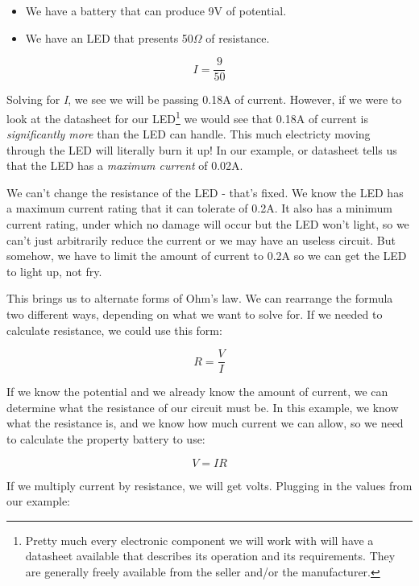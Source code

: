 \documentclass[10pt]{report}
\begin{document}
\begin{itemize}
\item We have a battery that can produce 9V of potential.
\item We have an LED that presents 50$\Omega$ of resistance.
\end{itemize}

\begin{equation}
I = \frac{9}{50}
\end{equation}

Solving for \textit{I}, we see we will be passing 0.18A of current. However, if we were to look at the datasheet for our LED\footnote{Pretty much every electronic component we will work with will have a datasheet available that describes its operation and its requirements. They are generally freely available from the seller and/or the manufacturer.} we would see that 0.18A of current is \textit{significantly more} than the LED can handle. This much electricty moving through the LED will literally burn it up! In our example, or datasheet tells us that the LED has a \textit{maximum current} of 0.02A. 

We can't change the resistance of the LED - that's fixed. We know the LED has a maximum current rating that it can tolerate of 0.2A. It also has a minimum current rating, under which no damage will occur but the LED won't light, so we can't just arbitrarily reduce the current or we may have an useless circuit. But somehow, we have to limit the amount of current to 0.2A so we can get the LED to light up, not fry.

This brings us to alternate forms of Ohm's law. We can rearrange the formula two different ways, depending on what we want to solve for. If we needed to calculate resistance, we could use this form:

\begin{equation}
R = \frac{V}{I}
\end{equation}

If we know the potential and we already know the amount of current, we can determine what the resistance of our circuit must be. In this example, we know what the resistance is, and we know how much current we can allow, so we need to calculate the property battery to use:

\begin{equation}
V = IR
\end{equation}

If we multiply current by resistance, we will get volts. Plugging in the values from our example:
\end{document}
